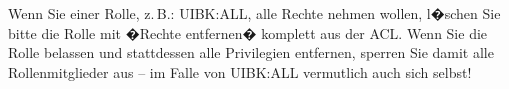 %
%

\begin{Hinweis}
  Wenn Sie einer Rolle, z.\,B.: UIBK:ALL, alle Rechte nehmen wollen,
  l�schen Sie bitte die Rolle mit �Rechte entfernen� komplett aus der
  ACL. Wenn Sie die Rolle belassen und stattdessen alle Privilegien
  entfernen, sperren Sie damit alle Rollenmitglieder aus -- im Falle
  von UIBK:ALL vermutlich auch sich selbst!
\end{Hinweis}

%

